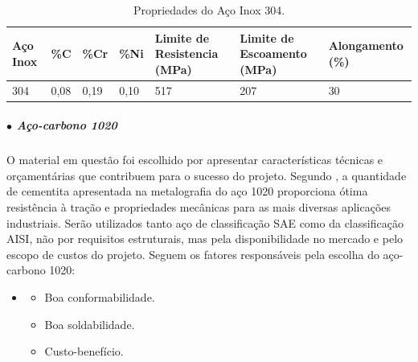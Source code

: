 \begin{table}[H]
    \centering
    \caption{Propriedades do Aço Inox 304.}
    \label{fig:PropAI}
    \begin{adjustbox}{max width = \textwidth}
        \begin{tabular}{|L{2cm}|C{2cm}|C{2cm}|C{2cm}|C{3cm}|C{3cm}|C{2.8cm}|}
            \hline
            \textbf{Aço Inox} & \textbf{\%C} & \textbf{\%Cr} & \textbf{\%Ni} & \textbf{Limite de Resistencia (MPa)} & \textbf{Limite de Escoamento (MPa)} & \textbf{Alongamento (\%)} \\ \hline
            
              304 & 0,08 & 0,19 & 0,10  & 517 & 207 & 30              \\ \hline
            
        \end{tabular}
    \end{adjustbox}
\end{table}

\subparagraph*{$\bullet$ Aço-carbono 1020} \hfill

O material em questão foi escolhido por apresentar características técnicas e orçamentárias que contribuem para o sucesso do projeto. Segundo \cite{Aco_1020_ensaio}, a quantidade de cementita apresentada na metalografia do aço 1020 proporciona ótima resistência à traç{\~a}o e propriedades mecânicas para as mais diversas aplicações industriais. Serão utilizados tanto aço de classificação SAE como da classificação AISI, não por requisitos estruturais, mas pela disponibilidade no mercado e pelo escopo de custos do projeto. Seguem os fatores responsáveis pela escolha do aço-carbono 1020:

\begin{itemize}
    \item []
    \begin{itemize}
        \item Boa conformabilidade.
        \item Boa soldabilidade.
        \item Custo-benefício.
    \end{itemize}
\end{itemize}

